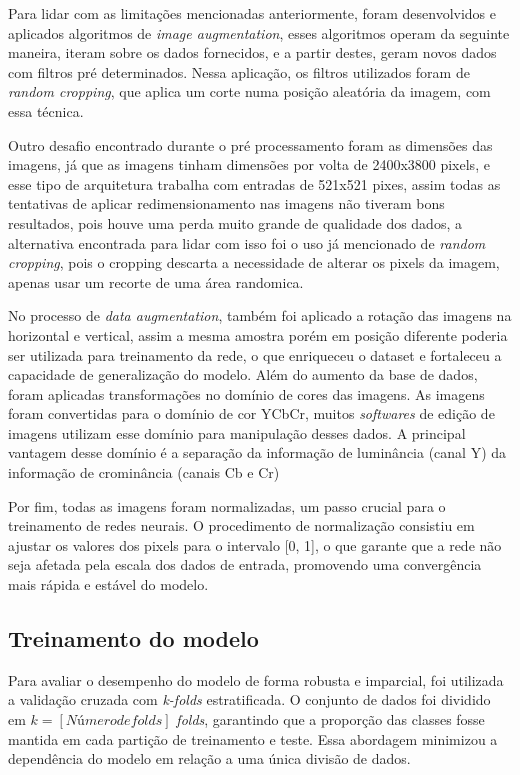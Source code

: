 Para lidar com as limitações mencionadas anteriormente, foram desenvolvidos e aplicados algoritmos de \textit{image augmentation}, esses algoritmos operam da seguinte maneira, iteram sobre os dados fornecidos, e a partir destes, geram novos dados com filtros pré determinados. Nessa aplicação, os filtros utilizados foram de \textit{random cropping}, que aplica um corte numa posição aleatória da imagem, com essa técnica.

Outro desafio encontrado durante o pré processamento foram as dimensões das imagens, já que as imagens tinham dimensões por volta de 2400x3800 pixels, e esse tipo de arquitetura trabalha com entradas de 521x521 pixes, assim todas as tentativas de aplicar redimensionamento nas imagens não tiveram bons resultados, pois houve uma perda muito grande de qualidade dos dados, a alternativa encontrada para lidar com isso foi o uso já mencionado de \textit{random cropping}, pois o cropping descarta a necessidade de alterar os pixels da imagem, apenas usar um recorte de uma área randomica.

No processo de \textit{data augmentation}, também foi aplicado a rotação das imagens na horizontal e vertical, assim a mesma amostra porém em posição diferente poderia ser utilizada para treinamento da rede, o que enriqueceu o dataset e fortaleceu a capacidade de generalização do modelo. 
Além do aumento da base de dados, foram aplicadas transformações no domínio de cores das imagens. As imagens foram convertidas para o domínio de cor YCbCr, muitos \textit{softwares} de edição de imagens utilizam esse domínio para manipulação desses dados. A principal vantagem desse domínio é a separação da informação de luminância (canal Y) da informação de crominância (canais Cb e Cr)

Por fim, todas as imagens foram normalizadas, um passo crucial para o treinamento de redes neurais. O procedimento de normalização consistiu em ajustar os valores dos pixels para o intervalo [0, 1], o que garante que a rede não seja afetada pela escala dos dados de entrada, promovendo uma convergência mais rápida e estável do modelo.

\subsection{Treinamento do modelo}

Para avaliar o desempenho do modelo de forma robusta e imparcial, foi utilizada a validação cruzada com \textit{k-folds} estratificada. O conjunto de dados foi dividido em \(k= [Número de folds]\) \textit{folds}, garantindo que a proporção das classes fosse mantida em cada partição de treinamento e teste. Essa abordagem minimizou a dependência do modelo em relação a uma única divisão de dados.

